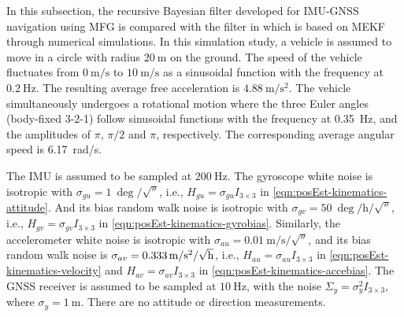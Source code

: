 In this subsection, the recursive Bayesian filter developed for IMU-GNSS navigation using MFG is compared with the filter in \cite{sola2017quaternion} which is based on MEKF through numerical simulations.
In this simulation study, a vehicle is assumed to move in a circle with radius $\SI{20}{\meter}$ on the ground.
The speed of the vehicle fluctuates from $\SI{0}{\meter/\second}$ to $\SI{10}{\meter/\second}$ as a sinusoidal function with the frequency at $\SI{0.2}{\hertz}$.
The resulting average free acceleration is $\SI{4.88}{\meter/\second\squared}$.
The vehicle simultaneously undergoes a rotational motion where the three Euler angles (body-fixed 3-2-1) follow sinusoidal functions with the frequency at \SI{0.35}{\hertz}, and the amplitudes of $\pi$, $\pi/2$ and $\pi$, respectively.
The corresponding average angular speed is \SI{6.17}{\radian/\second}.

The IMU is assumed to be sampled at $\SI{200}{\hertz}$.
The gyroscope white noise is isotropic with $\sigma_{gu} = \SI{1}{\deg/\sqrt{\second}}$, i.e., $H_{gu} = \sigma_{gu}I_{3\times 3}$ in \eqref{eqn:posEst-kinematics-attitude}.
And its bias random walk noise is isotropic with $\sigma_{gv} = \SI{50}{\deg/\hour/\sqrt{\second}}$, i.e., $H_{gv} = \sigma_{gv}I_{3\times 3}$ in \eqref{eqn:posEst-kinematics-gyrobias}.
Similarly, the accelerometer white noise is isotropic with $\sigma_{au} = \SI{0.01}{\meter/\second/\sqrt{\second}}$, and its bias random walk noise is $\sigma_{av} = \SI{0.333}{\meter/\second\squared/\sqrt{\hour}}$, i.e., $H_{au} = \sigma_{au}I_{3\times 3}$ in \eqref{eqn:posEst-kinematics-velocity} and $H_{av} = \sigma_{av}I_{3\times 3}$ in \eqref{eqn:posEst-kinematics-accebias}.
The GNSS receiver is assumed to be sampled at $\SI{10}{\hertz}$, with the noise $\Sigma_y = \sigma_y^2I_{3\times 3}$, where $\sigma_y = \SI{1}{\meter}$.
There are no attitude or direction measurements.

